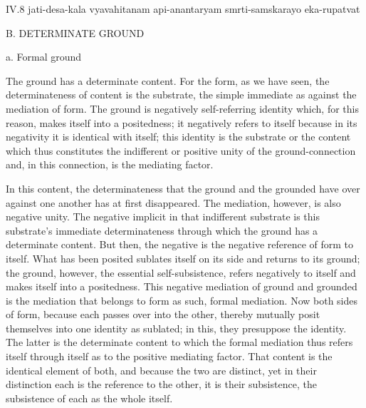 IV.8
jati-desa-kala vyavahitanam api-anantaryam smrti-samskarayo eka-rupatvat

B. DETERMINATE GROUND

a. Formal ground

The ground has a determinate content.
For the form, as we have seen,
the determinateness of content is the substrate,
the simple immediate as against the mediation of form.
The ground is negatively self-referring identity which,
for this reason, makes itself into a positedness;
it negatively refers to itself because in its negativity
it is identical with itself;
this identity is the substrate or the content
which thus constitutes the indifferent
or positive unity of the ground-connection
and, in this connection, is the mediating factor.

In this content, the determinateness that
the ground and the grounded have over
against one another has at first disappeared.
The mediation, however, is also negative unity.
The negative implicit in that indifferent substrate is
this substrate's immediate determinateness through which
the ground has a determinate content.
But then, the negative is the negative reference of form to itself.
What has been posited sublates itself on its side
and returns to its ground;
the ground, however, the essential self-subsistence,
refers negatively to itself and makes itself into a positedness.
This negative mediation of ground and grounded is
the mediation that belongs to form as such, formal mediation.
Now both sides of form, because each passes over into the other,
thereby mutually posit themselves into one identity as sublated;
in this, they presuppose the identity.
The latter is the determinate content
to which the formal mediation thus refers itself
through itself as to the positive mediating factor.
That content is the identical element of both,
and because the two are distinct,
yet in their distinction each is
the reference to the other,
it is their subsistence,
the subsistence of each as the whole itself.

